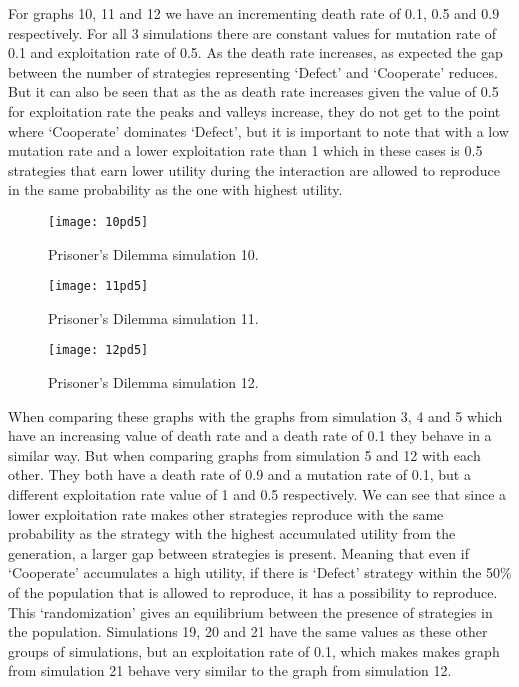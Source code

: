 \documentclass{book}
\begin{document}
For graphs 10, 11 and 12 we have an incrementing death rate of 0.1, 0.5 and 0.9 respectively. For all 3 simulations there are constant values for mutation rate of 0.1 and exploitation rate of 0.5. As the death rate increases, as expected the gap between the number of strategies representing `Defect' and `Cooperate' reduces. But it can also be seen that as the as death rate increases given the value of 0.5 for exploitation rate the peaks and valleys increase, they do not get to the point where `Cooperate' dominates `Defect', but it is important to note that with a low mutation rate and a lower exploitation rate than 1 which in these cases is 0.5 strategies that earn lower utility during the interaction are allowed to reproduce in the same probability as the one with highest utility. 

\begin{figure}[H]
\begin{center}
	\texttt{[image: 10pd5]}

\caption{ Prisoner's Dilemma simulation 10.}
\label{fig:pds10}	
\end{center}
\end{figure}

\begin{figure}[H]
\begin{center}
	\texttt{[image: 11pd5]}
	
\caption{ Prisoner's Dilemma simulation 11.}
\label{fig:pds11}	
\end{center}
\end{figure}

\begin{figure}[H]
\begin{center}
	\texttt{[image: 12pd5]}

\caption{ Prisoner's Dilemma simulation 12.}
\label{fig:pds12}	
\end{center}
\end{figure}

When comparing these graphs with the graphs from simulation 3, 4 and 5 which have an increasing value of death rate and a death rate of 0.1 they behave in a similar way. But when comparing graphs from simulation 5 and 12 with each other. They both have a death rate of 0.9 and a mutation rate of 0.1, but a different exploitation rate value of 1 and 0.5 respectively. We can see that since a lower exploitation rate makes other strategies reproduce with the same probability as the strategy with the highest accumulated utility from the generation, a larger gap between strategies is present. Meaning that even if `Cooperate' accumulates a high utility, if there is `Defect' strategy within the 50\% of the population that is allowed to reproduce, it has a possibility to reproduce. This `randomization' gives an equilibrium between the presence of strategies in the population. Simulations 19, 20 and 21 have the same values as these other groups of simulations, but an exploitation rate of 0.1, which makes makes graph from simulation 21 behave very similar to the graph from simulation 12.
\end{document}
